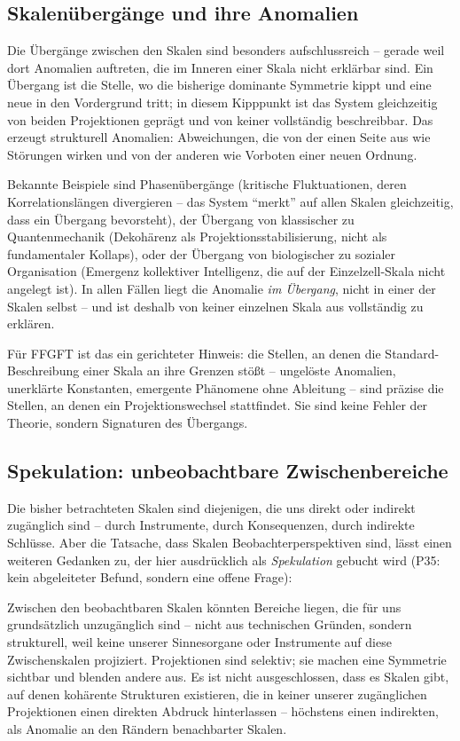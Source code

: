 \subsection*{Skalenübergänge und ihre Anomalien}

Die Übergänge zwischen den Skalen sind besonders aufschlussreich -- gerade
weil dort Anomalien auftreten, die im Inneren einer Skala nicht erklärbar
sind. Ein Übergang ist die Stelle, wo die bisherige dominante Symmetrie kippt
und eine neue in den Vordergrund tritt; in diesem Kipppunkt ist das System
gleichzeitig von beiden Projektionen geprägt und von keiner vollständig
beschreibbar. Das erzeugt strukturell Anomalien: Abweichungen, die von der
einen Seite aus wie Störungen wirken und von der anderen wie Vorboten einer
neuen Ordnung.

Bekannte Beispiele sind Phasenübergänge (kritische Fluktuationen, deren
Korrelationslängen divergieren -- das System \enquote{merkt} auf allen Skalen
gleichzeitig, dass ein Übergang bevorsteht), der Übergang von klassischer zu
Quantenmechanik (Dekohärenz als Projektionsstabilisierung, nicht als
fundamentaler Kollaps), oder der Übergang von biologischer zu sozialer
Organisation (Emergenz kollektiver Intelligenz, die auf der Einzelzell-Skala
nicht angelegt ist). In allen Fällen liegt die Anomalie \emph{im Übergang},
nicht in einer der Skalen selbst -- und ist deshalb von keiner einzelnen
Skala aus vollständig zu erklären.

Für FFGFT ist das ein gerichteter Hinweis: die Stellen, an denen die
Standard-Beschreibung einer Skala an ihre Grenzen stößt -- ungelöste
Anomalien, unerklärte Konstanten, emergente Phänomene ohne Ableitung -- sind
präzise die Stellen, an denen ein Projektionswechsel stattfindet. Sie sind
keine Fehler der Theorie, sondern Signaturen des Übergangs.

\subsection*{Spekulation: unbeobachtbare Zwischenbereiche}

Die bisher betrachteten Skalen sind diejenigen, die uns direkt oder indirekt
zugänglich sind -- durch Instrumente, durch Konsequenzen, durch indirekte
Schlüsse. Aber die Tatsache, dass Skalen Beobachterperspektiven sind, lässt
einen weiteren Gedanken zu, der hier ausdrücklich als \emph{Spekulation}
gebucht wird (P35: kein abgeleiteter Befund, sondern eine offene Frage):

Zwischen den beobachtbaren Skalen könnten Bereiche liegen, die für uns
grundsätzlich unzugänglich sind -- nicht aus technischen Gründen, sondern
strukturell, weil keine unserer Sinnesorgane oder Instrumente auf diese
Zwischenskalen projiziert. Projektionen sind selektiv; sie machen eine
Symmetrie sichtbar und blenden andere aus. Es ist nicht ausgeschlossen, dass
es Skalen gibt, auf denen kohärente Strukturen existieren, die in keiner
unserer zugänglichen Projektionen einen direkten Abdruck hinterlassen --
höchstens einen indirekten, als Anomalie an den Rändern benachbarter Skalen.


